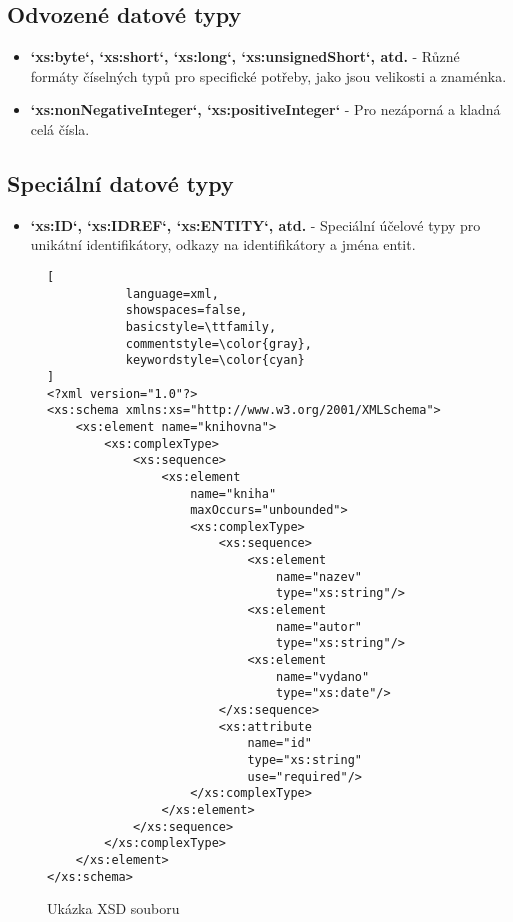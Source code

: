 \subsection{Odvozené datové typy}
\begin{itemize}
    \item \textbf{`xs:byte`, `xs:short`, `xs:long`, `xs:unsignedShort`, atd.} - Různé formáty číselných typů pro specifické potřeby, jako jsou velikosti a znaménka.
    \item \textbf{`xs:nonNegativeInteger`, `xs:positiveInteger`} - Pro nezáporná a kladná celá čísla.
\end{itemize}

\subsection{Speciální datové typy}
\begin{itemize}
    \item \textbf{`xs:ID`, `xs:IDREF`, `xs:ENTITY`, atd.} - Speciální účelové typy pro unikátní identifikátory, odkazy na identifikátory a jména entit.
\end{itemize}

\begin{figure}[H]
\centering
\begin{lstlisting}[
           language=xml,
           showspaces=false,
           basicstyle=\ttfamily,
           commentstyle=\color{gray},
           keywordstyle=\color{cyan}
]
<?xml version="1.0"?>
<xs:schema xmlns:xs="http://www.w3.org/2001/XMLSchema">
    <xs:element name="knihovna">
        <xs:complexType>
            <xs:sequence>
                <xs:element 
                    name="kniha" 
                    maxOccurs="unbounded">
                    <xs:complexType>
                        <xs:sequence>
                            <xs:element
                                name="nazev" 
                                type="xs:string"/>
                            <xs:element
                                name="autor" 
                                type="xs:string"/>
                            <xs:element 
                                name="vydano" 
                                type="xs:date"/>
                        </xs:sequence>
                        <xs:attribute 
                            name="id" 
                            type="xs:string" 
                            use="required"/>
                    </xs:complexType>
                </xs:element>
            </xs:sequence>
        </xs:complexType>
    </xs:element>
</xs:schema>

\end{lstlisting}
\caption{Ukázka XSD souboru}
\label{fig:xsd_file}
\end{figure}
